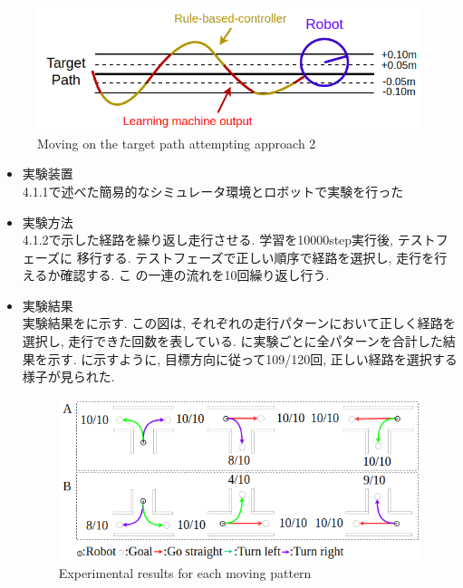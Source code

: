 \begin{figure}[hbtp]
  \centering
 \includegraphics[keepaspectratio, scale=0.58]
      {images/act1.5.png}
 \caption{Moving on the target path attempting approach 2}
 \label{Fig:act1.5}
\end{figure}

\begin{itemize}
  \item 実験装置\\
  4.1.1で述べた簡易的なシミュレータ環境とロボットで実験を行った
  \item 実験方法\\
  4.1.2で示した経路を繰り返し走行させる. 学習を10000step実行後, テストフェーズに
  移行する. テストフェーズで正しい順序で経路を選択し, 走行を行えるか確認する. こ
  の一連の流れを10回繰り返し行う.
  \item 実験結果\\
  実験結果をに示す. この図は, それぞれの走行パターンにおいて正しく経路を選択し, 走行できた回数を表している. に実験ごとに全パターンを合計した結果を示す. 
  に示すように, 目標方向に従って109/120回, 正しい経路を選択する様子が見られた. 

  
  \begin{figure}[hbtp]
    \centering
   \includegraphics[keepaspectratio, scale=0.55]
        {images/10000step_act1.5.png}
   \caption{Experimental results for each moving pattern}
   \label{Fig:10000step_act1.5}
  \end{figure}  
  

\end{itemize}
